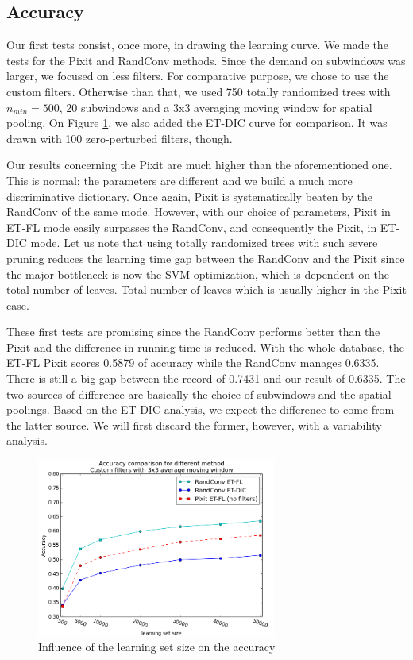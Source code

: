 \documentclass[a4paper]{report}
\newlength{\larg}
\begin{document}
	\subsection{Accuracy}
	Our first tests consist, once more, in drawing the learning curve. We made the tests for the Pixit and RandConv methods. Since the demand on subwindows was larger, we focused on less filters. For comparative purpose, we chose to use the custom filters. Otherwise than that, we used 750 totally randomized trees with $n_{min} = 500$, 20 subwindows and a 3x3 averaging moving window for spatial pooling. On Figure \ref{fig:ETFLAccFSize}, we also added the ET-DIC curve for comparison. It was drawn with 100 zero-perturbed filters, though.
	\par
	Our results concerning the Pixit are much higher than the aforementioned one. This is normal; the parameters are different and we build a much more discriminative dictionary. Once again, Pixit is systematically beaten by the RandConv of the same mode. However, with our choice of parameters, Pixit in ET-FL mode easily surpasses the RandConv, and consequently the Pixit, in ET-DIC mode. Let us note that using totally randomized trees with such severe pruning reduces the learning time gap between the RandConv and the Pixit since the major bottleneck is now the SVM optimization, which is dependent on the total number of leaves. Total number of leaves which is usually higher in the Pixit case.
	\par
	These first tests are promising since the RandConv performs better than the Pixit and the difference in running time is reduced. With the whole database, the ET-FL Pixit scores 0.5879 of accuracy while the RandConv manages 0.6335. There is still a big gap between the record of 0.7431 and our result of 0.6335. The two sources of difference are basically the choice of subwindows and the spatial poolings. Based on the ET-DIC analysis, we expect the difference to come from the latter source. We will first discard the former, however, with a variability analysis.
	
	
	\begin{figure}
		\centering
			\includegraphics[width=0.7\textwidth]{images/ETFLAccFSize.png}
		\caption{\label{fig:ETFLAccFSize}Influence of the learning set size on the accuracy}
	\end{figure}
	
\end{document}
